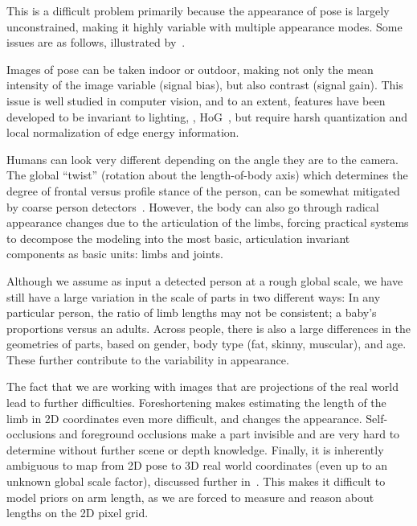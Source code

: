 This is a difficult problem primarily because the appearance of pose is largely 
unconstrained, making it highly variable with multiple appearance modes.  Some 
issues are as follows, illustrated by~.

 Images of pose can be taken indoor or outdoor, making not 
only the mean intensity of the image variable (signal bias), but also contrast 
(signal gain). This issue is well studied in computer vision, and to an extent, 
features have been developed to be invariant to lighting, \eg, HoG~\citep{hog}, 
but require harsh quantization and local normalization of edge energy 
information. 

 Humans can look very different depending on the 
angle they are to the camera.  The global ``twist'' (rotation about the 
length-of-body axis) which determines the degree of frontal versus profile 
stance of the person, can be somewhat mitigated by coarse person 
detectors~\citep{andriluka2010}.  However, the body can also go through radical 
appearance changes due to the articulation of the limbs, forcing practical 
systems to decompose the modeling into the most basic, articulation invariant 
components as basic units: limbs and joints.

 Although we assume as input a detected person at a 
rough global scale, we have still have a large variation in the scale of parts 
in two different ways: In any particular person, the ratio of limb lengths may 
not be consistent; \eg a baby's proportions versus an adults.  Across people, 
there is also a large differences in the geometries of parts, based on gender, 
body type (fat, skinny, muscular), and age.  These further contribute to the 
variability in appearance.

 The fact that we are working with images that are 
projections of the real world lead to further difficulties.  Foreshortening 
makes estimating the length of the limb in 2D coordinates even more difficult, 
and changes the appearance.  Self-occlusions and foreground occlusions make a 
part invisible and are very hard to determine without further scene or depth 
knowledge.  Finally, it is inherently ambiguous to map from 2D pose to 3D real 
world coordinates (even up to an unknown global scale factor), discussed 
further in~.  This makes it difficult to model priors on 
arm length, as we are forced to measure and reason about lengths on the 2D 
pixel grid.

